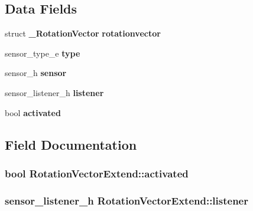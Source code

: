 \subsection*{Data Fields}
\begin{DoxyCompactItemize}
\item 
struct {\bf \-\_\-\-Rotation\-Vector} {\bfseries rotationvector}\label{structRotationVectorExtend_a3a0a423d644a254a7a1ab560ac388d10}

\item 
sensor\-\_\-type\-\_\-e {\bfseries type}\label{structRotationVectorExtend_a40c67e273cd4123c4f79b642334cbb96}

\item 
sensor\-\_\-h {\bfseries sensor}\label{structRotationVectorExtend_a32a8fa9fca739237339c29c6ac97a472}

\item 
sensor\-\_\-listener\-\_\-h {\bfseries listener}\label{structRotationVectorExtend_a696d2520d591804b724044240ce031ad}

\item 
bool {\bfseries activated}\label{structRotationVectorExtend_a9882eaa8861a9ea08bc8647335216d95}

\end{DoxyCompactItemize}


\subsection{Field Documentation}
\subsubsection[{activated}]{\setlength{\rightskip}{0pt plus 5cm}bool Rotation\-Vector\-Extend\-::activated}\label{structRotationVectorExtend_a9882eaa8861a9ea08bc8647335216d95}
\subsubsection[{listener}]{\setlength{\rightskip}{0pt plus 5cm}sensor\-\_\-listener\-\_\-h Rotation\-Vector\-Extend\-::listener}\label{structRotationVectorExtend_a696d2520d591804b724044240ce031ad}
